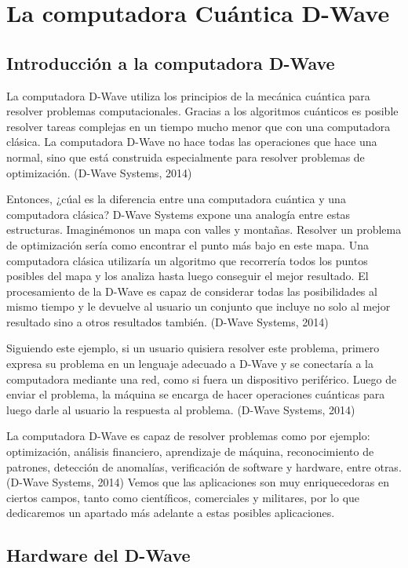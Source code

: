 \documentclass[11pt,a4paper]{article}
\begin{document}
\section*{La computadora Cuántica D-Wave}
\subsection*{Introducción a la computadora D-Wave}

La computadora D-Wave utiliza los principios de la mecánica cuántica para resolver problemas computacionales. Gracias a los algoritmos cuánticos es posible resolver tareas complejas en un tiempo mucho menor que con una computadora clásica. La computadora D-Wave no hace todas las operaciones que hace una normal, sino que está construida especialmente para resolver problemas de optimización. (D-Wave Systems, 2014)

Entonces, ¿cúal es la diferencia entre una computadora cuántica y una computadora clásica? D-Wave Systems expone una analogía entre estas estructuras. Imaginémonos un mapa con valles y montañas. Resolver un problema de optimización sería como encontrar el punto más bajo en este mapa. Una computadora clásica utilizaría un algoritmo que recorrería todos los puntos posibles del mapa y los analiza hasta luego conseguir el mejor resultado. El procesamiento de la D-Wave es capaz de considerar todas las posibilidades al mismo tiempo y le devuelve al usuario un conjunto que incluye no solo al mejor resultado sino a otros resultados también. (D-Wave Systems, 2014)

Siguiendo este ejemplo, si un usuario quisiera resolver este problema, primero expresa su problema en un lenguaje adecuado a D-Wave y se conectaría a la computadora mediante una red, como si fuera un dispositivo periférico. Luego de enviar el problema, la máquina se encarga de hacer operaciones cuánticas para luego darle al usuario la respuesta al problema.  (D-Wave Systems, 2014)

La computadora D-Wave es capaz de resolver problemas como por ejemplo: optimización, análisis financiero, aprendizaje de máquina, reconocimiento de patrones, detección de anomalías, verificación de software y hardware, entre otras. (D-Wave Systems, 2014) Vemos que las aplicaciones son muy enriquecedoras en ciertos campos, tanto como científicos, comerciales y militares, por lo que dedicaremos un apartado más adelante a estas posibles aplicaciones.

\subsection*{Hardware del D-Wave}
\end{document}

